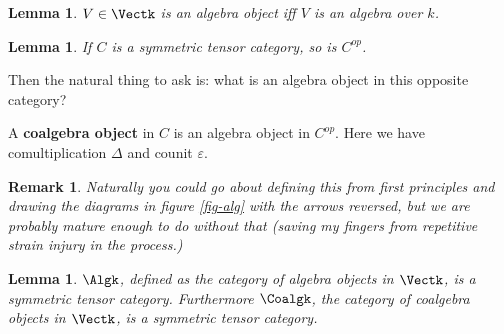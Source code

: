 \documentclass[12pt]{article}
\theoremstyle{break}
\theoremstyle{nonumberbreak}
\theoremstyle{changebreak}
\newtheorem{lem}[thm]{Lemma}
\theoremstyle{break}
\theoremstyle{nonumberbreak}
\theoremstyle{nonumberplain}
\theoremstyle{change}
\newtheorem{rmk}[thm]{Remark}
\begin{document}
\begin{lem}
	$V\in\Vectk$ is an algebra object iff $V$ is an algebra over $k$.
\end{lem}

\begin{lem}
	If $C$ is a symmetric tensor category, so is $C^{op}$.
\end{lem}

Then the natural thing to ask is: what is an algebra object in this opposite category?
\begin{defn}
	A \textbf{coalgebra object} in $C$ is an algebra object in $C^{op}$. Here we have 
	comultiplication $\Delta$ and counit $\varepsilon$.
\end{defn}
\begin{rmk}
	Naturally you could go about defining this from first principles and drawing the diagrams
	in figure \ref{fig-alg} with the arrows reversed, but we are probably mature enough
	to do without that (saving my fingers from repetitive strain injury in the process.)
\end{rmk}

\begin{lem}
	$\Algk$, defined as the category of algebra objects in $\Vectk$, is a symmetric tensor category. Furthermore
	$\Coalgk$, the category of coalgebra objects in $\Vectk$, is a symmetric tensor category.
\end{lem}
\end{document}
